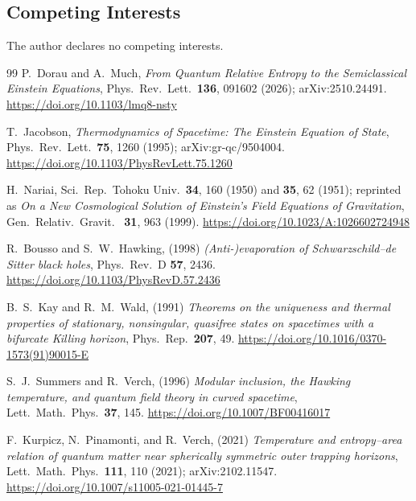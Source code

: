 \documentclass[11pt]{article}
\begin{document}
\subsection*{Competing Interests}
The author declares no competing interests.

\begingroup
\footnotesize
\begin{thebibliography}{99}\setlength{\itemsep}{1pt}\setlength{\parskip}{0pt}
 P.~Dorau and A.~Much, \emph{From Quantum Relative Entropy to the Semiclassical Einstein Equations}, Phys.\ Rev.\ Lett.\ \textbf{136}, 091602 (2026); arXiv:2510.24491.
\url{https://doi.org/10.1103/lmq8-nsty}

 T.~Jacobson, \emph{Thermodynamics of Spacetime: The Einstein Equation of State}, Phys.\ Rev.\ Lett.\ \textbf{75}, 1260 (1995); arXiv:gr-qc/9504004. \url{https://doi.org/10.1103/PhysRevLett.75.1260}

 H.~Nariai, Sci.\ Rep.\ Tohoku Univ.\ \textbf{34}, 160 (1950) and \textbf{35}, 62 (1951); reprinted as \emph{On a New Cosmological Solution of Einstein's Field Equations of Gravitation}, Gen.\ Relativ.\ Gravit.\
\newline
\textbf{31}, 963 (1999). \url{https://doi.org/10.1023/A:1026602724948}

 R.~Bousso and S.~W.~Hawking, (1998) \emph{(Anti-)evaporation of Schwarzschild--de Sitter black holes}, Phys.\ Rev.\ D \textbf{57}, 2436.
\url{https://doi.org/10.1103/PhysRevD.57.2436}

 B.~S.~Kay and R.~M.~Wald, (1991) \emph{Theorems on the uniqueness and thermal properties of stationary, nonsingular, quasifree states on spacetimes with a bifurcate Killing horizon}, Phys.\ Rep.\ \textbf{207}, 49.
\newline
\url{https://doi.org/10.1016/0370-1573(91)90015-E}

 S.~J.~Summers and R.~Verch, (1996) \emph{Modular inclusion, the Hawking temperature, and quantum field theory in curved spacetime}, Lett.\ Math.\ Phys.\ \textbf{37}, 145.
\url{https://doi.org/10.1007/BF00416017}

 F.~Kurpicz, N.~Pinamonti, and R.~Verch, (2021) \emph{Temperature and entropy--area relation of quantum matter near spherically symmetric outer trapping horizons}, Lett.\ Math.\ Phys.\ \textbf{111}, 110 (2021); arXiv:2102.11547. 
\newline
\url{https://doi.org/10.1007/s11005-021-01445-7}


\end{thebibliography}
\end{document}
